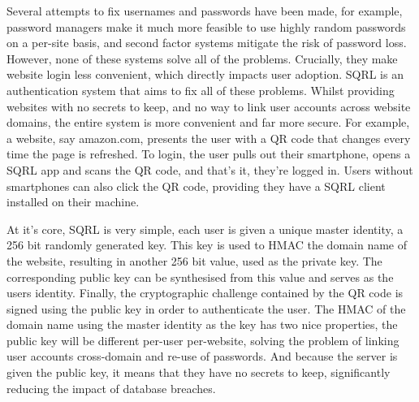 Several attempts to fix usernames and passwords have been made, for example, password managers make it much more feasible to use highly random passwords on a per-site basis, and second factor systems mitigate the risk of password loss. However, none of these systems solve all of the problems. Crucially, they make website login less convenient, which directly impacts user adoption. SQRL is an authentication system that aims to fix all of these problems. Whilst providing websites with no secrets to keep, and no way to link user accounts across website domains, the entire system is more convenient and far more secure. For example, a website, say amazon.com, presents the user with a QR code that changes every time the page is refreshed. To login, the user pulls out their smartphone, opens a SQRL app and scans the QR code, and that's it, they're logged in. Users without smartphones can also click the QR code, providing they have a SQRL client installed on their machine.

At it's core, SQRL is very simple, each user is given a unique master identity, a 256 bit randomly generated key. This key is used to HMAC the domain name of the website, resulting in another 256 bit value, used as the private key. The corresponding public key can be synthesised from this value and serves as the users identity. Finally, the cryptographic challenge contained by the QR code is signed using the public key in order to authenticate the user. The HMAC of the domain name using the master identity as the key has two nice properties, the public key will be different per-user per-website, solving the problem of linking user accounts cross-domain and re-use of passwords. And because the server is given the public key, it means that they have no secrets to keep, significantly reducing the impact of database breaches.
